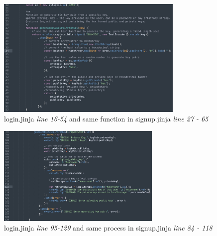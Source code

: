 \documentclass[12pt]{article}
\begin{document}
\begin{enumerate}
            \begin{figure}[H]
                \centering{}
                \includegraphics[width=0.8\textwidth]{graphs/generate_key_pairs.jpg}
                \caption{login.jinja \textit{line 16-54} and same function in signup.jinja \textit{line 27 - 65}}
                \label{generate_key_pairs}
            \end{figure}

            \begin{figure}[H]
                \centering{}
                \includegraphics[width=0.7\textwidth]{graphs/store_key_pairs.jpg}
                \caption{login.jinja \textit{line 95-129} and same process in signup.jinja \textit{line 84 - 118}}
                \label{store_key_pairs}
            \end{figure}


\end{enumerate}
\end{document}
